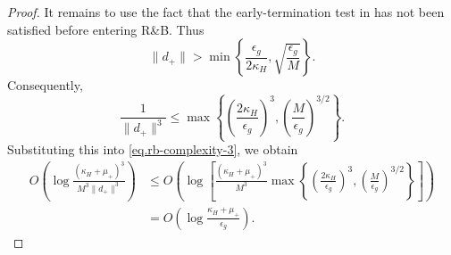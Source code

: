 \documentclass{article}
\numberwithin{equation}{section}
\numberwithin{equation}{section}
\begin{document}
\begin{proof}
    It remains to use the fact that the early-termination test in
     has not been satisfied before entering R\&B.
    Thus
    \[
        \|d_+\|
        >
        \min\left\{
        \frac{\epsilon_g}{2\kappa_H},
        \sqrt{\frac{\epsilon_g}{M}}
        \right\}.
    \]
    Consequently,
    \[
        \frac{1}{\|d_+\|^3}
        \le
        \max\left\{
        \left(\frac{2\kappa_H}{\epsilon_g}\right)^3,
        \left(\frac{M}{\epsilon_g}\right)^{3/2}
        \right\}.
    \]
    Substituting this into \eqref{eq.rb-complexity-3}, we obtain
    \begin{align*}
        O\left(
        \log
        \frac{
                (\kappa_H+\mu_+)^3
            }{
                M^3\|d_+\|^3
            }
        \right)
         & \le
        O\left(
        \log
        \left[
            \frac{(\kappa_H+\mu_+)^3}{M^3}
            \max\left\{
            \left(\frac{2\kappa_H}{\epsilon_g}\right)^3,
            \left(\frac{M}{\epsilon_g}\right)^{3/2}
            \right\}
            \right]
        \right) \\
         & =
        O\left(
        \log\frac{\kappa_H+\mu_+}{\epsilon_g}
        \right).
    \end{align*}
\end{proof}
\end{document}
